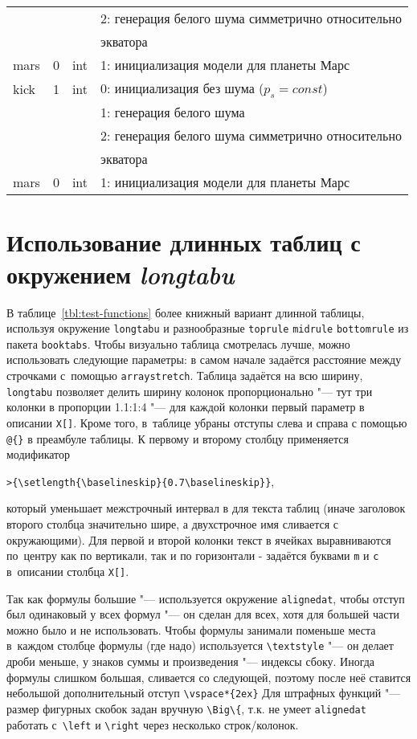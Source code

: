 \begin{longtable}[c]{|l|c|l|l|}
          &   &     & 2: генерация белого шума симметрично относительно \\
      & & & экватора    \\
     mars & 0 & int & 1: инициализация модели для планеты Марс     \\
    kick & 1 & int & 0: инициализация без шума ($p_s = const$) \\
          &   &     & 1: генерация белого шума                  \\
          &   &     & 2: генерация белого шума симметрично относительно \\
      & & & экватора    \\
     mars & 0 & int & 1: инициализация модели для планеты Марс     \\ 
    \end{longtable}
\normalsize%
\endgroup
\section{Использование длинных таблиц с окружением \textit{longtabu}} \label{AppendixB2a}

В таблице~\ref{tbl:test-functions} более книжный вариант 
длинной таблицы, используя окружение \verb!longtabu! и разнообразные
\verb!toprule! \verb!midrule! \verb!bottomrule! из пакета
\verb!booktabs!. Чтобы визуально таблица смотрелась лучше, можно
использовать следующие параметры: в самом начале задаётся расстояние
между строчками с~помощью \verb!arraystretch!. Таблица задаётся на
всю ширину, \verb!longtabu! позволяет делить ширину колонок
пропорционально "--- тут три колонки в пропорции 1.1:1:4 "--- для каждой
колонки первый параметр в описании \verb!X[]!. Кроме того, в~таблице
убраны отступы слева и справа с помощью \verb!@{}! в
преамбуле таблицы. К первому и второму столбцу применяется
модификатор 

\verb!>{\setlength{\baselineskip}{0.7\baselineskip}}!,

\noindent который уменьшает межстрочный интервал в для текста таблиц (иначе
заголовок второго столбца значительно шире, а двухстрочное имя
сливается с окружающими). Для первой и второй колонки текст в ячейках
выравниваются по~центру как по вертикали, так и по горизонтали -
задаётся буквами \verb!m! и \verb!c! в~описании столбца \verb!X[]!. 

Так как формулы большие "--- используется окружение \verb!alignedat!,
чтобы отступ был одинаковый у всех формул "--- он сделан для всех, хотя
для большей части можно было и не использовать.  Чтобы формулы
занимали поменьше места в~каждом столбце формулы (где надо)
используется \verb!\textstyle! "--- он делает дроби меньше, у знаков
суммы и произведения "--- индексы сбоку. Иногда формулы слишком большая,
сливается со следующей, поэтому после неё ставится небольшой
дополнительный отступ \verb!\vspace*{2ex}!  Для штрафных функций "---
размер фигурных скобок задан вручную \verb!\Big\{!, т.к. не умеет
\verb!alignedat! работать с~\verb!\left! и \verb!\right! через
несколько строк/колонок.



